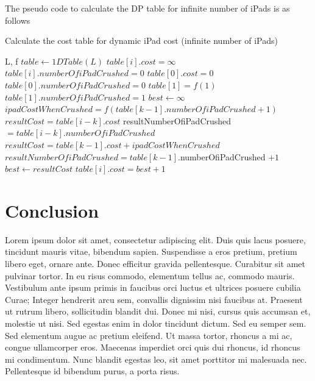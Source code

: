 \documentclass[12pt,a4paper,oneside]{report}
\begin{document}
The pseudo code to calculate the DP table for infinite number of iPads is as follows

\begin{algorithm}[H]
\caption{Calculate the cost table for dynamic iPad cost (infinite number of iPads)}
\begin{algorithmic}[1]
\REQUIRE L, f
\STATE $table \leftarrow 1DTable(L)$
	\STATE $table[i].cost = \infty$
	\STATE $table[i].numberOfiPadCrushed = 0$
\ENDFOR
\STATE $table[0].cost = 0$
\STATE $table[0].numberOfiPadCrushed  = 0$
\STATE $table[1] = f(1)$
\STATE $table[1].numberOfiPadCrushed  = 1$
	\STATE $best \leftarrow \infty$
		\STATE $ipadCostWhenCrushed =  f(table[k-1].numberOfiPadCrushed +1)$
			\STATE $resultCost= table[i-k].cost$
			\STATE resultNumberOfiPadCrushed $= table[i-k].numberOfiPadCrushed$
		\ELSE
			\STATE $resultCost= table[k-1].cost + ipadCostWhenCrushed$
			\STATE $resultNumberOfiPadCrushed = table[k-1].$numberOfiPadCrushed $+ 1$	
		\ENDIF
			\STATE $best \leftarrow resultCost$
		\ENDIF
	\ENDFOR
	\STATE $table[i].cost = best + 1$
\ENDFOR
\end{algorithmic}
\end{algorithm}


\chapter{Conclusion}
Lorem ipsum dolor sit amet, consectetur adipiscing elit. Duis quis lacus posuere, tincidunt mauris vitae, bibendum sapien. Suspendisse a eros pretium, pretium libero eget, ornare ante. Donec efficitur gravida pellentesque. Curabitur sit amet pulvinar tortor. In eu risus commodo, elementum tellus ac, commodo mauris. Vestibulum ante ipsum primis in faucibus orci luctus et ultrices posuere cubilia Curae; Integer hendrerit arcu sem, convallis dignissim nisi faucibus at. Praesent ut rutrum libero, sollicitudin blandit dui. Donec mi nisi, cursus quis accumsan et, molestie ut nisi. Sed egestas enim in dolor tincidunt dictum. Sed eu semper sem. Sed elementum augue ac pretium eleifend. Ut massa tortor, rhoncus a mi ac, congue ullamcorper eros. Maecenas imperdiet orci quis dui rhoncus, id rhoncus mi condimentum. Nunc blandit egestas leo, sit amet porttitor mi malesuada nec. Pellentesque id bibendum purus, a porta risus.
\end{document}
